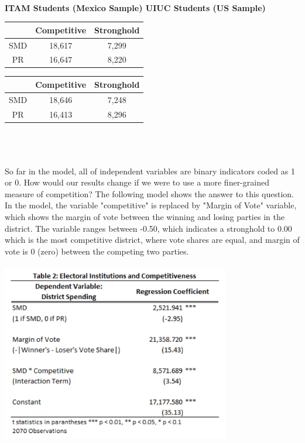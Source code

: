 \documentclass{article}
\begin{document}
\\
\textbf{ITAM Students (Mexico Sample) UIUC Students (US Sample)}\\
\begin{left}
	\begin{tabular}{ |c|c|c| } 
		\hline
		 & Competitive & Stronghold \\ 
		\hline
		SMD & 18,617 & 7,299 \\ 
		\hline
		PR & 16,647 & 8,220 \\ 
		\hline
	\end{tabular}
\end{left}
\begin{right}
	\begin{tabular}{ |c|c|c| } 
		\hline
		 & Competitive & Stronghold \\ 
		\hline
		SMD & 18,646 & 7,248 \\ 
		\hline
		PR & 16,413 & 8,296 \\ 
		\hline
	\end{tabular}
\end{right}\\
\\
\\
So far in the model, all of independent variables are binary indicators coded as 1 or 0. How would our results change if we were to use a more finer-grained measure of competition? The following model shows the answer to this question. In the model, the variable "competitive" is replaced by "Margin of Vote" variable, which shows the margin of vote between the winning and losing parties in the district. The variable ranges between -0.50, which indicates a stronghold to 0.00 which is the most competitive district, where vote shares are equal, and margin of vote is 0 (zero) between the competing two parties. \\
\\
\includegraphics[width=100mm]{Regression_Fine}\\
\end{document}
